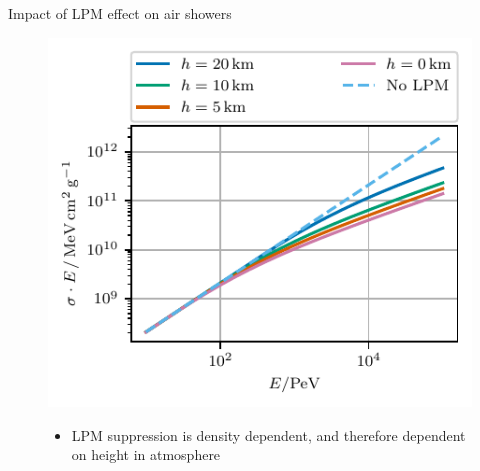 \documentclass[t]{beamer}
\begin{document}
\begin{columns}[onlytextwidth]
\begin{column}{0.45\textwidth}
\begin{block}[equal height group=PLOTS]{Impact of LPM effect on air showers}
\begin{figure}
\begin{minipage}[t]{0.49\textwidth}
\begin{itemize}
                \end{itemize}
              \end{minipage}%
              \hfill
              \begin{minipage}[t]{0.49\textwidth}
                \includegraphics[width=\linewidth, keepaspectratio]{../plots/lpm_cross_photopair_small.pdf}
                  \vspace{-1.5cm}
                  \begin{itemize}
                      \item LPM suppression is density dependent, and therefore dependent on height in atmosphere
                  \end{itemize}
              \end{minipage}
              \end{figure}
      \end{block}
    \end{column}
    \end{columns}
\end{document}
